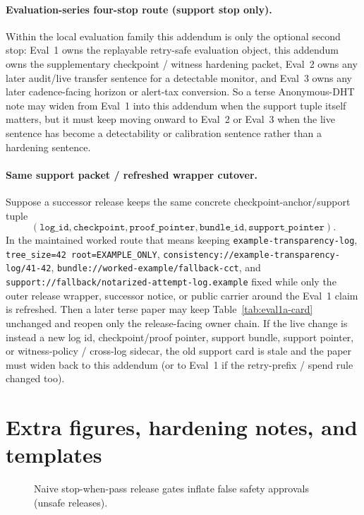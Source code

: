 \documentclass[11pt]{article}
\begin{document}
\paragraph{Evaluation-series four-stop route (support stop only).}
Within the local evaluation family this addendum is only the optional second stop: Eval~1 owns the replayable retry-safe evaluation object, this addendum owns the supplementary checkpoint / witness hardening packet, Eval~2 owns any later audit/live transfer sentence for a detectable monitor, and Eval~3 owns any later cadence-facing horizon or alert-tax conversion.
So a terse Anonymous-DHT note may widen from Eval~1 into this addendum when the support tuple itself matters, but it must keep moving onward to Eval~2 or Eval~3 when the live sentence has become a detectability or calibration sentence rather than a hardening sentence.

\paragraph{Same support packet / refreshed wrapper cutover.}
Suppose a successor release keeps the same concrete checkpoint-anchor/support tuple
\[
(\texttt{log\_id},\texttt{checkpoint},\texttt{proof\_pointer},\texttt{bundle\_id},\texttt{support\_pointer}).
\]
In the maintained worked route that means keeping
\texttt{example-transparency-log},
\nolinkurl{tree_size=42 root=EXAMPLE_ONLY},
\texttt{consistency://example-transparency-log/41-42},
\texttt{bundle://worked-example/fallback-cct},
and \texttt{support://fallback/notarized-attempt-log.example}
fixed while only the outer release wrapper, successor notice, or public carrier around the Eval~1 claim is refreshed.
Then a later terse paper may keep Table~\ref{tab:eval1a-card} unchanged and reopen only the release-facing owner chain.
If the live change is instead a new log id, checkpoint/proof pointer, support bundle, support pointer, or witness-policy / cross-log sidecar, the old support card is stale and the paper must widen back to this addendum (or to Eval~1 if the retry-prefix / spend rule changed too).

\section{Extra figures, hardening notes, and templates}

\begin{figure}[t]
\centering
{}
\caption{Naive stop-when-pass release gates inflate false safety approvals (unsafe releases).}
\label{fig:stop_when_pass}
\end{figure}
\end{document}
